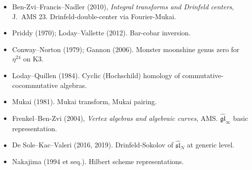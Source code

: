 \begin{itemize}
 Invent.~Math.~120. BKM weight and $c_N(0)/2$.
 \item Ben-Zvi--Francis--Nadler (2010), \emph{Integral transforms and
 Drinfeld centers}, J.~AMS 23. Drinfeld-double-center via Fourier-Mukai.
 \item Priddy (1970); Loday--Vallette (2012). Bar-cobar inversion.
 \item Conway--Norton (1979); Gannon (2006). Monster moonshine genus zero
 for $\eta^{24}$ on K3.
 \item Loday--Quillen (1984). Cyclic (Hochschild) homology of
 commutative-cocommutative algebras.
 \item Mukai (1981). Mukai transform, Mukai pairing.
 \item Frenkel--Ben-Zvi (2004), \emph{Vertex algebras and algebraic
 curves}, AMS. $\hat{\mathfrak{gl}}_\infty$ basic
 representation.
 \item De Sole--Kac--Valeri (2016, 2019). Drinfeld-Sokolov of
 $\hat{\mathfrak{sl}}_N$ at generic level.
 \item Nakajima (1994 et seq.). Hilbert scheme representations.
\end{itemize}

